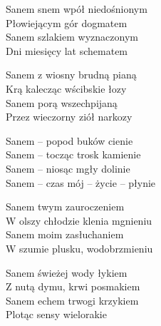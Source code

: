 \begin{text}
    Sanem snem wpół niedośnionym\\
    Płowiejącym gór dogmatem\\
    Sanem szlakiem wyznaczonym\\
    Dni miesięcy lat schematem

    Sanem z wiosny brudną pianą\\
    Krą kalecząc wścibskie łozy\\
    Sanem porą wszechpijaną\\
    Przez wieczorny ziół narkozy

    Sanem – popod buków cienie\\
    Sanem – tocząc trosk kamienie\\
    Sanem – niosąc mgły dolinie\\
    Sanem – czas mój – życie – płynie

    Sanem twym zauroczeniem\\
    W olszy chłodzie klenia mgnieniu\\
    Sanem moim zasłuchaniem\\
    W szumie plusku, wodobrzmieniu

    Sanem świeżej wody łykiem\\
    Z nutą dymu, krwi posmakiem\\
    Sanem echem trwogi krzykiem\\
    Plotąc sensy wielorakie
\end{text}
\begin{chord}

\end{chord}